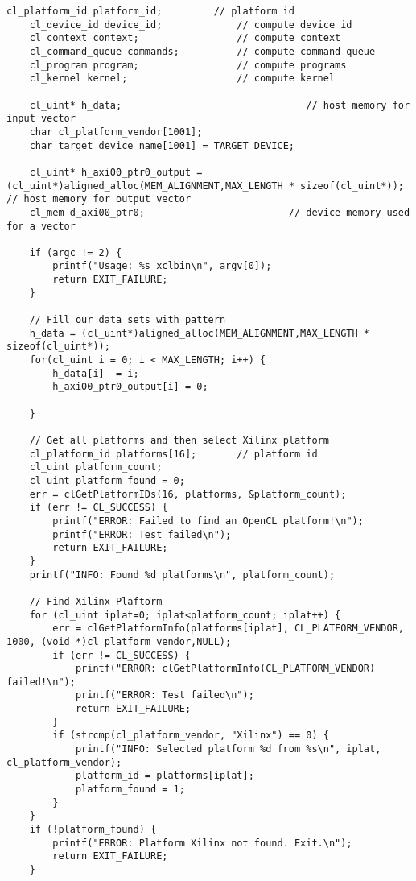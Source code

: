 \begin{lstlisting}[label=code:hostexample3, caption=Содержимое файла host\_example.cpp, breakatwhitespace=false]
    cl_platform_id platform_id;         // platform id
    cl_device_id device_id;             // compute device id
    cl_context context;                 // compute context
    cl_command_queue commands;          // compute command queue
    cl_program program;                 // compute programs
    cl_kernel kernel;                   // compute kernel

    cl_uint* h_data;                                // host memory for input vector
    char cl_platform_vendor[1001];
    char target_device_name[1001] = TARGET_DEVICE;

    cl_uint* h_axi00_ptr0_output = (cl_uint*)aligned_alloc(MEM_ALIGNMENT,MAX_LENGTH * sizeof(cl_uint*)); // host memory for output vector
    cl_mem d_axi00_ptr0;                         // device memory used for a vector

    if (argc != 2) {
        printf("Usage: %s xclbin\n", argv[0]);
        return EXIT_FAILURE;
    }

    // Fill our data sets with pattern
    h_data = (cl_uint*)aligned_alloc(MEM_ALIGNMENT,MAX_LENGTH * sizeof(cl_uint*));
    for(cl_uint i = 0; i < MAX_LENGTH; i++) {
        h_data[i]  = i;
        h_axi00_ptr0_output[i] = 0; 

    }

    // Get all platforms and then select Xilinx platform
    cl_platform_id platforms[16];       // platform id
    cl_uint platform_count;
    cl_uint platform_found = 0;
    err = clGetPlatformIDs(16, platforms, &platform_count);
    if (err != CL_SUCCESS) {
        printf("ERROR: Failed to find an OpenCL platform!\n");
        printf("ERROR: Test failed\n");
        return EXIT_FAILURE;
    }
    printf("INFO: Found %d platforms\n", platform_count);

    // Find Xilinx Plaftorm
    for (cl_uint iplat=0; iplat<platform_count; iplat++) {
        err = clGetPlatformInfo(platforms[iplat], CL_PLATFORM_VENDOR, 1000, (void *)cl_platform_vendor,NULL);
        if (err != CL_SUCCESS) {
            printf("ERROR: clGetPlatformInfo(CL_PLATFORM_VENDOR) failed!\n");
            printf("ERROR: Test failed\n");
            return EXIT_FAILURE;
        }
        if (strcmp(cl_platform_vendor, "Xilinx") == 0) {
            printf("INFO: Selected platform %d from %s\n", iplat, cl_platform_vendor);
            platform_id = platforms[iplat];
            platform_found = 1;
        }
    }
    if (!platform_found) {
        printf("ERROR: Platform Xilinx not found. Exit.\n");
        return EXIT_FAILURE;
    }


\end{lstlisting}
